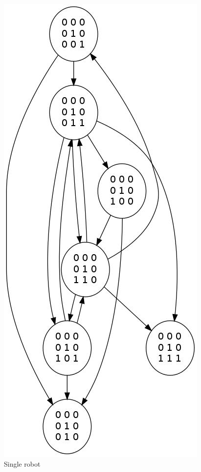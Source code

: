 \documentclass[11pt, a4paper]{article}
\theoremstyle{plain}
\theoremstyle{definition}
\theoremstyle{remark}
\begin{document}
\begin{figure}
\includegraphics[scale=0.50]{graph_images/graph_single_all.jpg}
\caption{Single robot}
\label{graph:single}
\end{figure}
\end{document}
